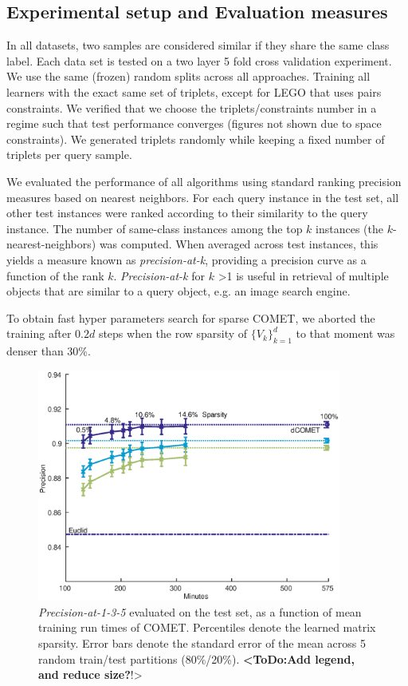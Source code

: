 \documentclass[twoside,11pt]{article}
\newcommand\todo[1]{\textbf{<ToDo:#1}!>}
\newcommand\mat[1]{{#1}}
\newcommand{\Vk}{\mat{V_k}}
\newcommand{\Vgrc}{\{\Vk\}_{k=1}^{d}} %
\begin{document}
\subsection{Experimental setup and Evaluation measures}
In all datasets, two samples are considered similar if they share the same class label. Each data set is tested on a two layer 5 fold cross validation experiment. We use the same (frozen) random splits across all approaches. Training all learners with the exact same set of triplets, except for LEGO that uses pairs constraints. We verified that we choose the triplets/constraints number in a regime such that test performance converges (figures not shown due to space constraints). We generated triplets randomly while keeping a fixed number of triplets per query sample.

We evaluated the performance of all algorithms using standard ranking precision measures based on nearest neighbors. For each query instance in the test set, all other test instances were ranked according to their similarity to the query instance. The number of same-class instances
among the top $k$ instances (the $k$-nearest-neighbors) was computed. When averaged across test
instances, this yields a measure known as \textit{precision-at-k},
providing a precision curve as a function of the rank $k$. \textit{Precision-at-k} for $k$ >1 is useful in retrieval of multiple objects that are similar to a query object, e.g. an image search engine.

To obtain fast hyper parameters search for sparse COMET, we aborted the training after $0.2 d$ steps when the row sparsity of $\Vgrc$ to that moment was denser than 30\%. 

\begin{figure}[ht]
\centering
\includegraphics[width=10cm]{sCOMET_precision_vs_runtime}
\captionsetup{font=small}
\caption{\textit{Precision-at-1-3-5} evaluated on the test set, as a function of mean training run times of COMET. Percentiles denote the learned matrix sparsity. Error bars denote the standard error of the mean across 5 random train/test partitions (80\%/20\%). \todo{Add legend, and reduce size?}}\label{spCometPrecTime}
\end{figure}
\end{document}
